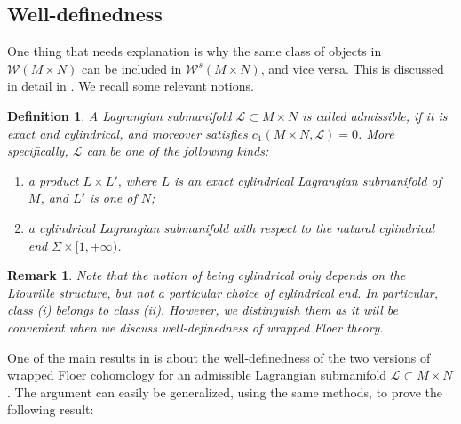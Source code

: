 \documentclass{amsart}
\newtheorem{definition}[theorem]{Definition}
\newtheorem{remark}[theorem]{Remark}
\numberwithin{equation}{section}
\numberwithin{figure}{section}
\begin{document}
\subsection{Well-definedness}\label{section: well-definedness of wrapped Floer theory in the product}
	One thing that needs explanation is why the same class of objects in $\mathcal{W}(M \times N)$ can be included in $\mathcal{W}^{s}(M \times N)$, and vice versa. This is discussed in detail in \cite{Gao1}. We recall some relevant notions. \par

\begin{definition}\label{definition of admissible Lagrangian submanifolds in the product}
	A Lagrangian submanifold $\mathcal{L} \subset M \times N$ is called admissible, if it is exact and cylindrical, and moreover satisfies $c_{1}(M \times N, \mathcal{L}) = 0$. More specifically, $\mathcal{L}$ can be one of the following kinds:
\begin{enumerate}[label=(\roman*)]

\item a product $L \times L'$, where $L$ is an exact cylindrical Lagrangian submanifold of $M$, and $L'$ is one of $N$;

\item a cylindrical Lagrangian submanifold with respect to the natural cylindrical end $\Sigma \times [1, +\infty)$.

\end{enumerate}
\end{definition}

\begin{remark}
	Note that the notion of being cylindrical only depends on the Liouville structure, but not a particular choice of cylindrical end. In particular, class (i) belongs to class (ii). However, we distinguish them as it will be convenient when we discuss well-definedness of wrapped Floer theory.
\end{remark}

	One of the main results in \cite{Gao1} is about the well-definedness of the two versions of wrapped Floer cohomology for an admissible Lagrangian submanifold $\mathcal{L} \subset M \times N$. The argument can easily be generalized, using the same methods, to prove the following result: \par
\end{document}
